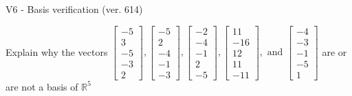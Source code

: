 \begin{exercise}
  \begin{exerciseTitle}V6 - Basis verification (ver. 614)\end{exerciseTitle}
  \begin{exerciseStatement}
    Explain why the vectors \(\left[\begin{array}{r}
-5 \\
3 \\
-5 \\
-3 \\
2
\end{array}\right] , \left[\begin{array}{r}
-5 \\
2 \\
-4 \\
-1 \\
-3
\end{array}\right] , \left[\begin{array}{r}
-2 \\
-4 \\
-1 \\
2 \\
-5
\end{array}\right] , \left[\begin{array}{r}
11 \\
-16 \\
12 \\
11 \\
-11
\end{array}\right] , \text{ and } \left[\begin{array}{r}
-4 \\
-3 \\
-1 \\
-5 \\
1
\end{array}\right]\) are or are not a basis of \(\mathbb{R}^5\)	



\end{exerciseStatement}
\end{exercise}

